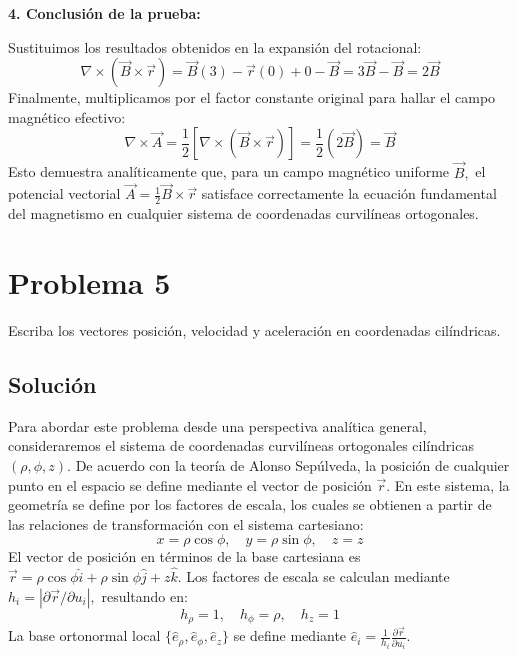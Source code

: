 \documentclass[a4paper]{article}
\begin{document}
\textbf{4. Conclusión de la prueba:}

Sustituimos los resultados obtenidos en la expansión del rotacional:
\begin{equation}
\nabla \times (\vec{B} \times \vec{r}) = \vec{B}(3) - \vec{r}(0) + 0 - \vec{B} = 3\vec{B} - \vec{B} = 2\vec{B}
\end{equation}
Finalmente, multiplicamos por el factor constante original para hallar el campo magnético efectivo:
\begin{equation}
\nabla \times \vec{A} = \frac{1}{2} [ \nabla \times (\vec{B} \times \vec{r}) ] = \frac{1}{2} (2\vec{B}) = \vec{B}
\end{equation}
Esto demuestra analíticamente que, para un campo magnético uniforme $\vec{B},$ el potencial vectorial $\vec{A} = \frac{1}{2} \vec{B} \times \vec{r}$ satisface correctamente la ecuación fundamental del magnetismo en cualquier sistema de coordenadas curvilíneas ortogonales.


\section{Problema 5}
Escriba los vectores posición, velocidad y aceleración en coordenadas cilíndricas.

\subsection{Solución}

Para abordar este problema desde una perspectiva analítica general, consideraremos el sistema de coordenadas curvilíneas ortogonales cilíndricas $(\rho, \phi, z).$ De acuerdo con la teoría de Alonso Sepúlveda, la posición de cualquier punto en el espacio se define mediante el vector de posición $\vec{r}.$ En este sistema, la geometría se define por los factores de escala, los cuales se obtienen a partir de las relaciones de transformación con el sistema cartesiano:
\begin{equation}
x = \rho \cos\phi, \quad y = \rho \sin\phi, \quad z = z
\end{equation}
El vector de posición en términos de la base cartesiana es $\vec{r} = \rho \cos\phi \hat{i} + \rho \sin\phi \hat{j} + z \hat{k}.$ Los factores de escala se calculan mediante $h_i = |\partial \vec{r} / \partial u_i|,$ resultando en:
\begin{equation}
h_\rho = 1, \quad h_\phi = \rho, \quad h_z = 1
\end{equation}
La base ortonormal local $\{\hat{e}_\rho, \hat{e}_\phi, \hat{e}_z\}$ se define mediante $\hat{e}_i = \frac{1}{h_i} \frac{\partial \vec{r}}{\partial u_i}.$
\end{document}
